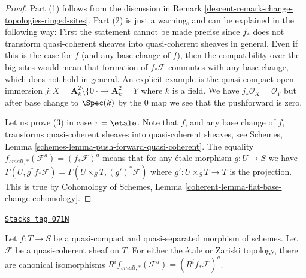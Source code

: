 \begin{proof}

Part (1) follows from the discussion in
Remark \ref{descent-remark-change-topologies-ringed-sites}.
Part (2) is just a warning, and can be explained in the following way:
First the statement cannot be made precise since $f_*$ does not
transform quasi-coherent sheaves into quasi-coherent sheaves in general.
Even if this is the case for $f$ (and any base change of $f$), then the
compatibility over the big sites would mean that formation of $f_*\mathcal{F}$
commutes with any base change, which does not hold in general.
An explicit example is the quasi-compact open immersion
$j : X = \mathbf{A}^2_k \setminus \{0\} \to \mathbf{A}^2_k = Y$
where $k$ is a field. We have $j_*\mathcal{O}_X = \mathcal{O}_Y$
but after base change to $\Spec(k)$ by the $0$ map
we see that the pushforward is zero.

\medskip\noindent
Let us prove (3) in case $\tau = \etale$. Note that $f$, and any
base change of $f$, transforms quasi-coherent sheaves
into quasi-coherent sheaves, see
Schemes, Lemma \ref{schemes-lemma-push-forward-quasi-coherent}.
The equality $f_{small, *}(\mathcal{F}^a) = (f_*\mathcal{F})^a$
means that for any \'etale morphism $g : U \to S$ we have
$\Gamma(U, g^*f_*\mathcal{F}) = \Gamma(U \times_S T, (g')^*\mathcal{F})$
where $g' : U \times_S T \to T$ is the projection. This is true by
Cohomology of Schemes, Lemma \ref{coherent-lemma-flat-base-change-cohomology}.
\end{proof}

\begin{lemma}
\label{descent-lemma-higher-direct-images-small-etale}
\href{https://stacks.math.columbia.edu/tag/071N}{\texttt{Stacks tag 071N}}

Let $f : T \to S$ be a quasi-compact and quasi-separated morphism of schemes.
Let $\mathcal{F}$ be a quasi-coherent sheaf on $T$. For either the \'etale
or Zariski topology, there are canonical isomorphisms
$R^if_{small, *}(\mathcal{F}^a) = (R^if_*\mathcal{F})^a$.
\end{lemma}

